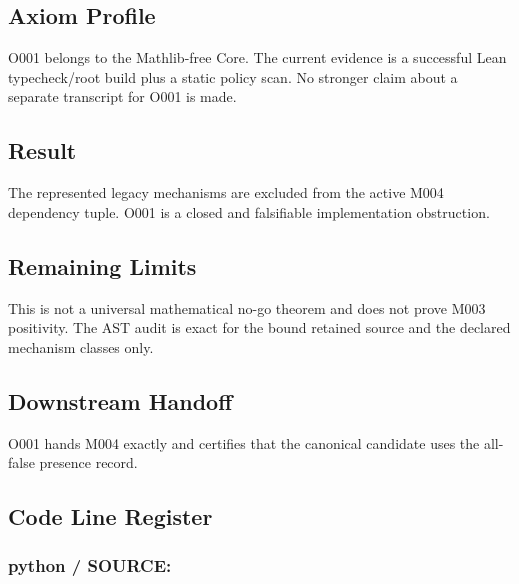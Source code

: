 \subsection{Axiom Profile}\label{axiom-profile-7}

O001 belongs to the Mathlib-free Core. The current evidence is a
successful Lean typecheck/root build plus a static policy scan. No
stronger claim about a separate \texttt{\protect{}} transcript for
O001 is made.

\subsection{Result}\label{result-21}

The represented legacy mechanisms are excluded from the active M004
dependency tuple. O001 is a closed and falsifiable implementation
obstruction.

\subsection{Remaining Limits}\label{remaining-limits-7}

This is not a universal mathematical no-go theorem and does not prove
M003 positivity. The AST audit is exact for the bound retained source
and the declared mechanism classes only.

\subsection{Downstream Handoff}\label{downstream-handoff-21}

O001 hands M004 exactly \texttt{\protect{}}
and certifies that the canonical candidate uses the all-false presence
record.

\subsection{Code Line Register}\label{code-line-register-7}

\subsubsection{\texorpdfstring{python / SOURCE:
\texttt{\protect{}}}{python / SOURCE: s07\_o001\_\_ist\_response\_independent\_directed\_bias\_obstruction.py}}\label{python-source-s07_o001__ist_response_independent_directed_bias_obstruction.py}

